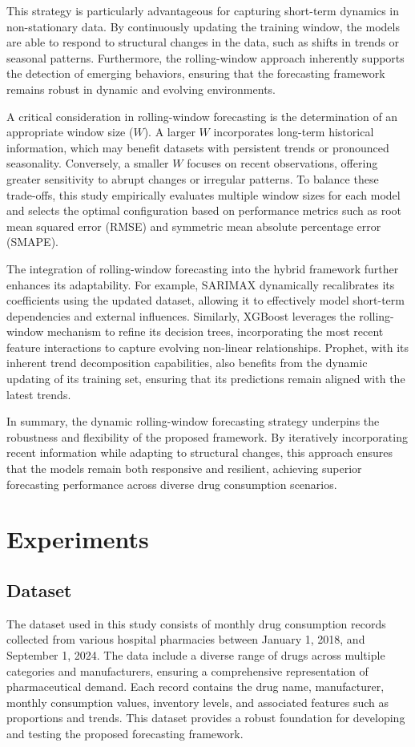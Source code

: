 \documentclass[journal]{IEEEtran}
\begin{document}
This strategy is particularly advantageous for capturing short-term dynamics in non-stationary data. By continuously updating the training window, the models are able to respond to structural changes in the data, such as shifts in trends or seasonal patterns. Furthermore, the rolling-window approach inherently supports the detection of emerging behaviors, ensuring that the forecasting framework remains robust in dynamic and evolving environments.

A critical consideration in rolling-window forecasting is the determination of an appropriate window size (\(W\)). A larger \(W\) incorporates long-term historical information, which may benefit datasets with persistent trends or pronounced seasonality. Conversely, a smaller \(W\) focuses on recent observations, offering greater sensitivity to abrupt changes or irregular patterns. To balance these trade-offs, this study empirically evaluates multiple window sizes for each model and selects the optimal configuration based on performance metrics such as root mean squared error (RMSE) and symmetric mean absolute percentage error (SMAPE).

The integration of rolling-window forecasting into the hybrid framework further enhances its adaptability. For example, SARIMAX dynamically recalibrates its coefficients using the updated dataset, allowing it to effectively model short-term dependencies and external influences. Similarly, XGBoost leverages the rolling-window mechanism to refine its decision trees, incorporating the most recent feature interactions to capture evolving non-linear relationships. Prophet, with its inherent trend decomposition capabilities, also benefits from the dynamic updating of its training set, ensuring that its predictions remain aligned with the latest trends.

In summary, the dynamic rolling-window forecasting strategy underpins the robustness and flexibility of the proposed framework. By iteratively incorporating recent information while adapting to structural changes, this approach ensures that the models remain both responsive and resilient, achieving superior forecasting performance across diverse drug consumption scenarios.

\section{Experiments}

\subsection{Dataset}
The dataset used in this study consists of monthly drug consumption records collected from various hospital pharmacies between January 1, 2018, and September 1, 2024. The data include a diverse range of drugs across multiple categories and manufacturers, ensuring a comprehensive representation of pharmaceutical demand. Each record contains the drug name, manufacturer, monthly consumption values, inventory levels, and associated features such as proportions and trends. This dataset provides a robust foundation for developing and testing the proposed forecasting framework.
\end{document}
